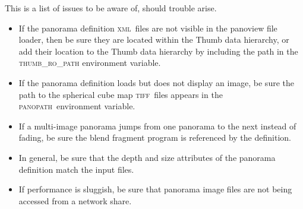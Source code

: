 \documentclass[article,oneside,11pt]{memoir}
\newcommand{\tiff}    {\textsc{tiff}}
\newcommand{\xml}     {\textsc{xml}}
\newcommand{\panopath}{\textsc{panopath}}
\begin{document}
\begin{Spacing}{1.1}
This is a list of issues to be aware of, should trouble arise.

\begin{itemize}
\item If the panorama definition \xml\ files are not visible in the panoview file loader, then be sure they are located within the Thumb data hierarchy, or add their location to the Thumb data hierarchy by including the path in the \textsc{thumb\_ro\_path} environment variable.

\item If the panorama definition loads but does not display an image, be sure the path to the spherical cube map \tiff\ files appears in the \panopath\ environment variable.

\item If a multi-image panorama jumps from one panorama to the next instead of fading, be sure the blend fragment program is referenced by the definition.

\item In general, be sure that the depth and size attributes of the panorama definition match the input files.

\item If performance is sluggish, be sure that panorama image files are not being accessed from a network share.
\end{itemize}

\end{Spacing}
\end{document}
